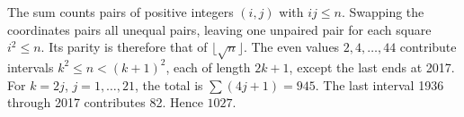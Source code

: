The sum counts pairs of positive integers $(i,j)$ with $ ij\le n $. Swapping the coordinates pairs all unequal pairs, leaving one unpaired pair for each square $ i^2\le n $. Its parity is therefore that of $\lfloor\sqrt n\rfloor $. The even values $ 2,4,\ldots,44 $ contribute intervals $ k^2\le n<(k+1)^2 $, each of length $ 2k+1 $, except the last ends at 2017. For $ k=2j $, $ j=1,\ldots,21 $, the total is $\sum(4j+1)=945 $. The last interval 1936 through 2017 contributes 82. Hence $\boxed{1027}$.

